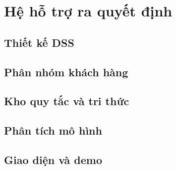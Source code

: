 \section{Hệ hỗ trợ ra quyết định}
\subsection{Thiết kế DSS}
\subsection{Phân nhóm khách hàng}
\subsection{Kho quy tắc và tri thức}
\subsection{Phân tích mô hình}
\subsection{Giao diện và demo}
